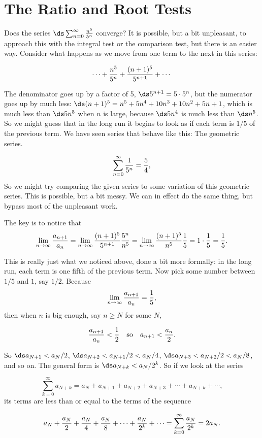 \section{The Ratio and Root Tests}\label{sec:ratioroottest}

Does the series $\ds\sum_{n=0}^\infty {n^5\over 5^n}$ converge? It is
possible, but a bit unpleasant, to approach this with the integral
test or the comparison test, but there is an easier way. Consider what
happens as we move from one term to the next in this series:

\[\cdots+{n^5\over5^n}+{(n+1)^5\over 5^{n+1}}+\cdots\]

The denominator goes up by a factor of 5, $\ds 5^{n+1}=5\cdot5^n$, but the
numerator goes up by much less: $\ds (n+1)^5=n^5+5n^4+10n^3+10n^2+5n+1$,
which is much less than $\ds 5n^5$ when $n$ is large, because $\ds 5n^4$ is
much less than $\ds n^5$. So we might guess that in the long run it begins
to look as if each term is $1/5$ of the previous term. We have seen
series that behave like this: The geometric series.

\[\sum_{n=0}^\infty {1\over 5^n} = {5\over4},\]
So we might try comparing the given series to some
variation of this geometric series. This is possible, but a bit
messy. We can in effect do the same thing, but bypass most of the
unpleasant work.

The key is to notice that
\[
  \lim_{n\to\infty} {a_{n+1}\over a_n}=
  \lim_{n\to\infty} {(n+1)^5\over 5^{n+1}}{5^n\over n^5}=
  \lim_{n\to\infty} {(n+1)^5\over n^5}{1\over 5}=1\cdot {1\over5}
    ={1\over 5}.
\]

This is really just what we noticed above, done a bit more formally:
in the long run, each term is one fifth of the previous term. Now pick
some number between $1/5$ and $1$, say $1/2$. Because
$$\lim_{n\to\infty} {a_{n+1}\over a_n}={1\over5},$$
then when $n$ is big enough, say $n\ge N$ for some $N$, 

\[
  {a_{n+1}\over a_n}<{1\over2} \quad \hbox{so}\quad a_{n+1}<{a_n\over2}.
\]

So $\ds a_{N+1}< a_N/2$, $\ds a_{N+2}<a_{N+1}/2<a_N/4$,
$\ds a_{N+3}<a_{N+2}/2<a_N/8$, and so on. The general form is
$\ds a_{N+k}< a_N/2^k$. So if we look at the series

\[
  \sum_{k=0}^\infty a_{N+k}=
  a_N+a_{N+1}+a_{N+2}+a_{N+3}+\cdots+a_{N+k}+\cdots,
\]
its terms are less than or equal to the terms of the sequence

\[
  a_N+{a_N\over2}+{a_N\over4}+{a_N\over8}+\cdots+{a_N\over2^k}+\cdots=
  \sum_{k=0}^\infty {a_N\over 2^k} = 2a_N.
\]

